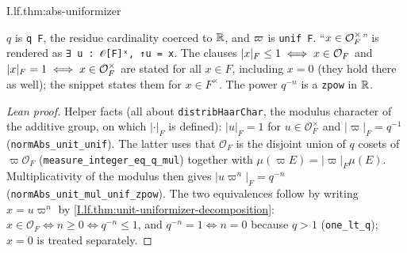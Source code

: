 \begin{theorem}
\end{theorem}
\begin{tfformal}{I.lf.thm:abs-uniformizer}
\begin{tffidelity}
$q$ is \texttt{q F}, the residue cardinality coerced to $\mathbb{R}$, and $\varpi$ is \texttt{unif F}. ``$x\in\mathcal{O}_F^\times$'' is rendered as \texttt{∃ u : 𝒪[F]ˣ, ↑u = x}. The clauses $\lvert x\rvert_F\le1\iff x\in\mathcal{O}_F$ and $\lvert x\rvert_F=1\iff x\in\mathcal{O}_F^\times$ are stated for all $x\in F$, including $x=0$ (they hold there as well); the snippet states them for $x\in F^\times$. The power $q^{-n}$ is a \texttt{zpow} in $\mathbb{R}$.
\end{tffidelity}
\end{tfformal}
\begin{proof}[Lean proof]
Helper facts (all about \texttt{distribHaarChar}, the modulus character of the additive group, on which $|\cdot|_F$ is defined): $|u|_F=1$ for $u\in\mathcal O_F^\times$ and $|\varpi|_F=q^{-1}$ (\texttt{normAbs\_unit\_unif}). The latter uses that $\mathcal O_F$ is the disjoint union of $q$ cosets of $\varpi\mathcal O_F$ (\texttt{measure\_integer\_eq\_q\_mul}) together with $\mu(\varpi E)=|\varpi|_F\mu(E)$. Multiplicativity of the modulus then gives $|u\varpi^n|_F=q^{-n}$ (\texttt{normAbs\_unit\_mul\_unif\_zpow}). The two equivalences follow by writing $x=u\varpi^n$ by \cref{I.lf.thm:unit-uniformizer-decomposition}: $x\in\mathcal O_F\iff n\ge0\iff q^{-n}\le1$, and $q^{-n}=1\iff n=0$ because $q>1$ (\texttt{one\_lt\_q}); $x=0$ is treated separately.
\end{proof}

